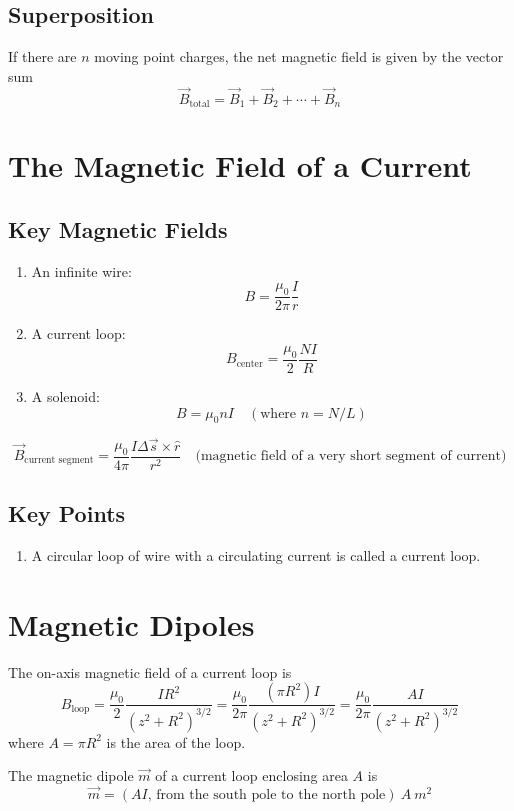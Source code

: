 \documentclass{article}
\begin{document}
\subsection*{Superposition}
If there are $n$ moving point charges, the net magnetic field is given by the vector sum
\[\vec{B}_\text{total}=\vec{B}_1+\vec{B}_2 + \cdots + \vec{B}_n\]

\section*{The Magnetic Field of a Current}

\subsection*{Key Magnetic Fields}
\begin{enumerate}
    \item An infinite wire: \[B=\frac{\mu_0}{2\pi}\frac{I}{r}\]
    \item A current loop: \[B_\text{center}=\frac{\mu_0}{2}\frac{NI}{R}\]
    \item A solenoid: \[B=\mu_0 nI\quad(\text{where }n=N/L)\]
\end{enumerate}

\[\vec{B}_\text{current segment}=\frac{\mu_0}{4\pi}\frac{I\Delta \vec{s}\times \hat{r}}{r^2}
\quad\text{(magnetic field of a very short segment of current)}\]

\subsection*{Key Points}
\begin{enumerate}
    \item A circular loop of wire with a circulating current is called a current loop.
\end{enumerate}

\section*{Magnetic Dipoles}
The on-axis magnetic field of a current loop is
\[B_\text{loop}=\frac{\mu_0}{2}\frac{IR^2}{{(z^2+R^2)}^{3/2}}=\frac{\mu_0}{2\pi}\frac{(\pi R^2)I}
{{(z^2+R^2)}^{3/2}}=\frac{\mu_0}{2\pi}\frac{AI}{{(z^2+R^2)}^{3/2}}\]
where $A=\pi R^2$ is the area of the loop. 

\vspace{1em}

The magnetic dipole $\vec{m}$ of a current loop enclosing area $A$ is 
\[\vec{m}=(AI\text{, from the south pole to the north pole})\: A\: m^2\]
\end{document}
